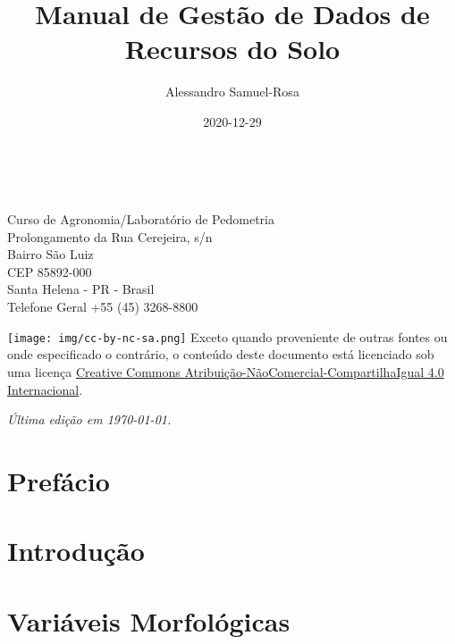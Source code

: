 \documentclass[
  a4paper,
  dvipsnames]{tufte-book}
\title{Manual de Gestão de Dados de Recursos do Solo}
\author{Alessandro Samuel-Rosa}
\date{2020-12-29}
\begin{document}
\maketitle

\newpage
\nopagecolor
\begin{fullwidth}
~\vfill
\thispagestyle{empty}
\setlength{\parindent}{0pt}
\setlength{\parskip}{\baselineskip}

\par{}

\par{
  Curso de Agronomia/Laboratório de Pedometria\\
  Prolongamento da Rua Cerejeira, s/n\\
  Bairro São Luiz\\
  CEP 85892-000\\
  Santa Helena - PR - Brasil\\
  Telefone Geral +55 (45) 3268-8800
}

\par{}

\par\texttt{[image: img/cc-by-nc-sa.png]} Exceto quando proveniente de outras fontes ou onde especificado o contrário, o conteúdo deste documento está licenciado sob uma licença \href{http://creativecommons.org/licenses/by-nc-sa/4.0/}{Creative Commons Atribuição-NãoComercial-CompartilhaIgual 4.0 Internacional}.

\par\textit{Última edição em \today.}
\end{fullwidth}

{
\hypersetup{linkcolor=}
\setcounter{tocdepth}{1}
\tableofcontents
}
\hypertarget{prefuxe1cio}{%
\chapter*{Prefácio}\label{prefuxe1cio}}

\hypertarget{intro}{%
\chapter{Introdução}\label{intro}}

\hypertarget{variuxe1veis-morfoluxf3gicas}{%
\chapter*{Variáveis Morfológicas}\label{variuxe1veis-morfoluxf3gicas}}
\end{document}
